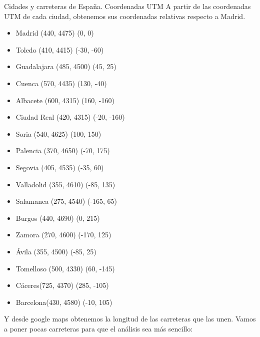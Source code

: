 \documentclass[11pt, a4paper, spanish, openright, twoside]{book}
\begin{document}
	\begin{section}{Cidades y carreteras de España. Coordenadas UTM}
		A partir de las coordenadas UTM de cada ciudad, obtenemos sus coordenadas relativas respecto a Madrid.
		\begin{itemize}
		\item Madrid	(440, 4475)		\textrightarrow	(0, 0)

		\item Toledo	(410, 4415)		\textrightarrow	(-30, -60)
		\item Guadalajara	(485, 4500)	\textrightarrow	(45, 25)
		\item Cuenca	(570,  4435)		\textrightarrow	(130, -40)
		\item Albacete	(600, 4315)	\textrightarrow	(160, -160)
		\item Ciudad Real 	(420, 4315)	\textrightarrow	(-20, -160)

		\item Soria	(540, 4625)		\textrightarrow	(100, 150)
		\item Palencia	(370, 4650)  	\textrightarrow	(-70, 175)
		\item Segovia	(405, 4535)	\textrightarrow	(-35, 60)
		\item Valladolid	(355, 4610)	\textrightarrow	(-85, 135)
		\item Salamanca	(275, 4540)	\textrightarrow	(-165, 65)
		\item Burgos	(440, 4690)		\textrightarrow	(0, 215)
		\item Zamora	(270, 4600)		\textrightarrow	(-170, 125)
		\item Ávila	(355, 4500)		\textrightarrow	(-85, 25)
		\item Tomelloso	(500, 4330)  	\textrightarrow	(60, -145)
		
		\item Cáceres(725, 4370)		\textrightarrow	(285, -105)	
		\item Barcelona(430, 4580)	\textrightarrow	(-10, 105)

		\end{itemize}

		Y desde google maps obtenemos la longitud de las carreteras que las unen. Vamos a poner pocas carreteras para que el análisis sea más sencillo:


\end{section}
\end{document}

